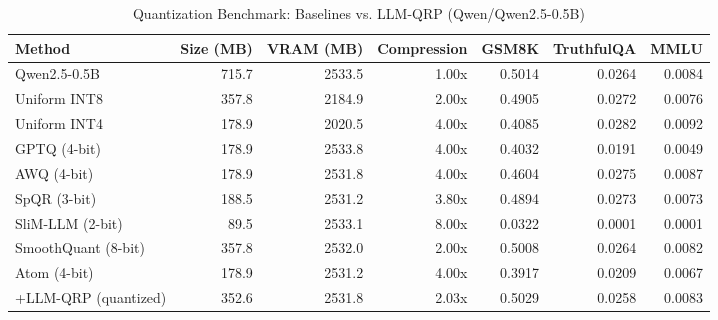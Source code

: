 \begin{table}[htbp]
  \centering
  \small
  \caption{Quantization Benchmark: Baselines vs. LLM-QRP (Qwen/Qwen2.5-0.5B)}
  \label{tab:benchmark}
  \begin{tabular}{lrrrrrr}
    \toprule
    \textbf{Method} & \textbf{Size (MB)} & \textbf{VRAM (MB)} & \textbf{Compression} & \textbf{GSM8K} & \textbf{TruthfulQA} & \textbf{MMLU} \\
    \midrule
    Qwen2.5-0.5B & 715.7 & 2533.5 & 1.00x & 0.5014 & 0.0264 & 0.0084 \\
    Uniform INT8 & 357.8 & 2184.9 & 2.00x & 0.4905 & 0.0272 & 0.0076 \\
    Uniform INT4 & 178.9 & 2020.5 & 4.00x & 0.4085 & 0.0282 & 0.0092 \\
    GPTQ (4-bit) & 178.9 & 2533.8 & 4.00x & 0.4032 & 0.0191 & 0.0049 \\
    AWQ (4-bit) & 178.9 & 2531.8 & 4.00x & 0.4604 & 0.0275 & 0.0087 \\
    SpQR (3-bit) & 188.5 & 2531.2 & 3.80x & 0.4894 & 0.0273 & 0.0073 \\
    SliM-LLM (2-bit) & 89.5 & 2533.1 & 8.00x & 0.0322 & 0.0001 & 0.0001 \\
    SmoothQuant (8-bit) & 357.8 & 2532.0 & 2.00x & 0.5008 & 0.0264 & 0.0082 \\
    Atom (4-bit) & 178.9 & 2531.2 & 4.00x & 0.3917 & 0.0209 & 0.0067 \\
    \midrule
    +LLM-QRP (quantized) & 352.6 & 2531.8 & 2.03x & 0.5029 & 0.0258 & 0.0083 \\
    \bottomrule
  \end{tabular}
\end{table}
